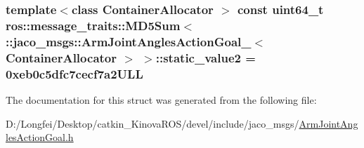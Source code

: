 \subsubsection[{\texorpdfstring{static\+\_\+value2}{static_value2}}]{\setlength{\rightskip}{0pt plus 5cm}template$<$class Container\+Allocator $>$ const uint64\+\_\+t ros\+::message\+\_\+traits\+::\+M\+D5\+Sum$<$ \+::{\bf jaco\+\_\+msgs\+::\+Arm\+Joint\+Angles\+Action\+Goal\+\_\+}$<$ Container\+Allocator $>$ $>$\+::static\+\_\+value2 = 0xeb0c5dfc7cecf7a2\+U\+LL\hspace{0.3cm}{\ttfamily [static]}}\hypertarget{structros_1_1message__traits_1_1MD5Sum_3_01_1_1jaco__msgs_1_1ArmJointAnglesActionGoal___3_01ContainerAllocator_01_4_01_4_acdfcd4a30fa304c047186e98d84094b9}{}\label{structros_1_1message__traits_1_1MD5Sum_3_01_1_1jaco__msgs_1_1ArmJointAnglesActionGoal___3_01ContainerAllocator_01_4_01_4_acdfcd4a30fa304c047186e98d84094b9}


The documentation for this struct was generated from the following file\+:\begin{DoxyCompactItemize}
\item 
D\+:/\+Longfei/\+Desktop/catkin\+\_\+\+Kinova\+R\+O\+S/devel/include/jaco\+\_\+msgs/\hyperlink{ArmJointAnglesActionGoal_8h}{Arm\+Joint\+Angles\+Action\+Goal.\+h}\end{DoxyCompactItemize}
